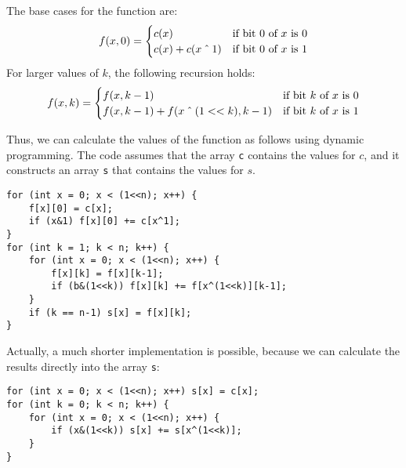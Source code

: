 The base cases for the function are:
\begin{equation*}
    f(x,0) = \begin{cases}
               c(x)          & \textrm{if bit 0 of $x$ is 0}\\
               c(x)+c(x \XOR 1) & \textrm{if bit 0 of $x$ is 1}\\
           \end{cases}
\end{equation*}
For larger values of $k$, the following recursion holds:
\begin{equation*}
    f(x,k) = \begin{cases}
               f(x,k-1)          & \textrm{if bit $k$ of $x$ is 0}\\
               f(x,k-1)+f(x \XOR (1 < < k),k-1)    & \textrm{if bit $k$ of $x$ is 1}\\
           \end{cases}
\end{equation*}

Thus, we can calculate the values of the function
as follows using dynamic programming.
The code assumes that the array \texttt{c}
contains the values for $c$,
and it constructs an array \texttt{s}
that contains the values for $s$.
\begin{lstlisting}
for (int x = 0; x < (1<<n); x++) {
    f[x][0] = c[x];
    if (x&1) f[x][0] += c[x^1];
}
for (int k = 1; k < n; k++) {
    for (int x = 0; x < (1<<n); x++) {
        f[x][k] = f[x][k-1];
        if (b&(1<<k)) f[x][k] += f[x^(1<<k)][k-1];
    }
    if (k == n-1) s[x] = f[x][k];
}
\end{lstlisting}

Actually, a much shorter implementation is possible,
because we can calculate the results directly
into the array \texttt{s}:
\begin{lstlisting}
for (int x = 0; x < (1<<n); x++) s[x] = c[x];
for (int k = 0; k < n; k++) {
    for (int x = 0; x < (1<<n); x++) {
        if (x&(1<<k)) s[x] += s[x^(1<<k)];
    }
}
\end{lstlisting}

